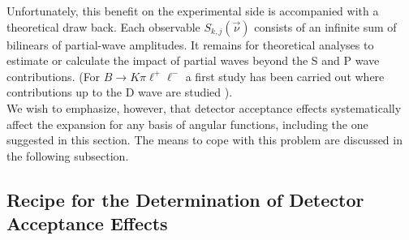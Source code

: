 \documentclass[aps,prd,reprint,nofootinbib,preprintnumbers]{revtex4}
\begin{document}
Unfortunately, this benefit on the experimental side is accompanied with a theoretical draw back. Each observable
$S_{k,j}(\vec{\nu})$ consists of an infinite sum of bilinears of partial-wave amplitudes. It remains for theoretical
analyses to estimate or calculate the impact of partial waves beyond the S and P wave contributions.
(For $B\to K\pi\ell^+\ell^-$ a first study has been carried out where contributions up to the D wave are studied \cite{Das:2014sra}).\\

We wish to emphasize, however, that detector acceptance effects systematically affect the expansion for any basis
of angular functions, including the one suggested in this section. The means to cope with this problem are discussed
in the following subsection.


\subsection{Recipe for the Determination of Detector Acceptance Effects}
\label{sec:systematics:acceptance}
\end{document}
